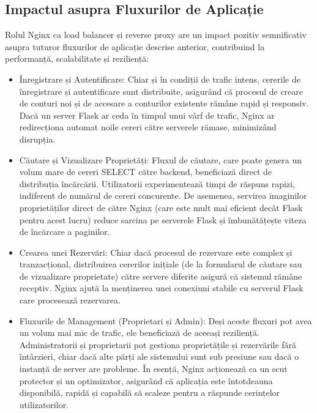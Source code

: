 \documentclass[12pt, a4paper, oneside, romanian]{teza-upb}
\begin{document}
\subsection{Impactul asupra Fluxurilor de Aplicație}
Rolul Nginx ca load balancer și reverse proxy are un impact pozitiv semnificativ asupra tuturor fluxurilor de aplicație descrise anterior, contribuind la performanță, scalabilitate și reziliență:
\begin{itemize}
	\item Înregistrare și Autentificare: Chiar și în condiții de trafic intens, cererile de înregistrare și autentificare sunt distribuite, asigurând că procesul de creare de conturi noi și de accesare a conturilor existente rămâne rapid și responsiv. Dacă un server Flask ar ceda în timpul unui vârf de trafic, Nginx ar redirecționa automat noile cereri către serverele rămase, minimizând disrupția.
	
	\item Căutare și Vizualizare Proprietăți: Fluxul de căutare, care poate genera un volum mare de cereri SELECT către backend, beneficiază direct de distribuția încărcării. Utilizatorii experimentează timpi de răspuns rapizi, indiferent de numărul de cereri concurente. De asemenea, servirea imaginilor proprietăților direct de către Nginx (care este mult mai eficient decât Flask pentru acest lucru) reduce sarcina pe serverele Flask și îmbunătățește viteza de încărcare a paginilor.
	
	\item Crearea unei Rezervări: Chiar dacă procesul de rezervare este complex și tranzacțional, distribuirea cererilor inițiale (de la formularul de căutare sau de vizualizare proprietate) către servere diferite asigură că sistemul rămâne receptiv. Nginx ajută la menținerea unei conexiuni stabile cu serverul Flask care procesează rezervarea.
	\item Fluxurile de Management (Proprietari și Admin): Deși aceste fluxuri pot avea un volum mai mic de trafic, ele beneficiază de aceeași reziliență. Administratorii și proprietarii pot gestiona proprietățile și rezervările fără întârzieri, chiar dacă alte părți ale sistemului sunt sub presiune sau dacă o instanță de server are probleme. În esență, Nginx acționează ca un scut protector și un optimizator, asigurând că aplicația este întotdeauna disponibilă, rapidă și capabilă să scaleze pentru a răspunde cerințelor utilizatorilor.
	
\end{itemize}
\end{document}
